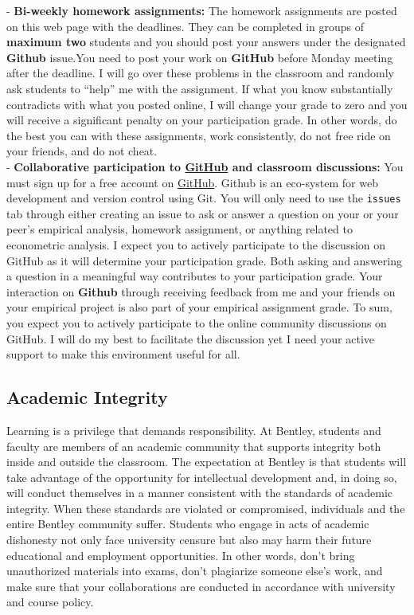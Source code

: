 \documentclass[
]{book}
\begin{document}
\begin{itemize}
  - \textbf{Bi-weekly homework assignments:} The homework assignments are posted on this web page with the deadlines. They can be completed in groups of \textbf{maximum two} students and you should post your answers under the designated \textbf{Github} issue.You need to post your work on \textbf{GitHub} before Monday meeting after the deadline. I will go over these problems in the classroom and randomly ask students to ``help'' me with the assignment. If what you know substantially contradicts with what you posted online, I will change your grade to zero and you will receive a significant penalty on your participation grade. In other words, do the best you can with these assignments, work consistently, do not free ride on your friends, and do not cheat.\\
  - \textbf{Collaborative participation to \href{https://github.com/}{GitHub} and classroom discussions:} You must sign up for a free account on \href{https://github.com/}{GitHub}. Github is an eco-system for web development and version control using Git. You will only need to use the \texttt{issues} tab through either creating an issue to ask or answer a question on your or your peer's empirical analysis, homework assignment, or anything related to econometric analysis. I expect you to actively participate to the discussion on GitHub as it will determine your participation grade. Both asking and answering a question in a meaningful way contributes to your participation grade. Your interaction on \textbf{Github} through receiving feedback from me and your friends on your empirical project is also part of your empirical assignment grade. To sum, you expect you to actively participate to the online community discussions on GitHub. I will do my best to facilitate the discussion yet I need your active support to make this environment useful for all.
\end{itemize}

\hypertarget{academic-integrity}{%
\subsection*{Academic Integrity}\label{academic-integrity}}

Learning is a privilege that demands responsibility. At Bentley, students and faculty are members of an academic community that supports integrity both inside and outside the classroom. The expectation at Bentley is that students will take advantage of the opportunity for intellectual development and, in doing so, will conduct themselves in a manner consistent with the standards of academic integrity. When these standards are violated or compromised, individuals and the entire Bentley community suffer. Students who engage in acts of academic dishonesty not only face university censure but also may harm their future educational and employment opportunities. In other words, don't bring unauthorized materials into exams, don't plagiarize someone else's work, and make sure that your collaborations are conducted in accordance with university and course policy.
\end{document}
